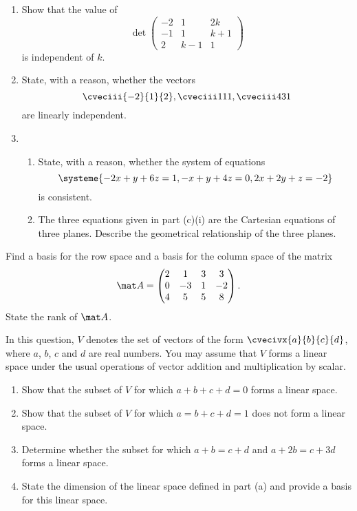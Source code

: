 \begin{problem}
    \begin{enumerate}
        \item Show that the value of \[\det \begin{pmatrix}
            -2 & 1 & 2k\\
            -1 & 1 & k+1\\
            2 & k-1 & 1
        \end{pmatrix}\] is independent of $k$.
        \item State, with a reason, whether the vectors \[\cveciii{-2}{1}{2}, \cveciii111, \cveciii431\] are linearly independent.
        \item \begin{enumerate}
            \item State, with a reason, whether the system of equations \[\systeme{-2x+y+6z=1,-x+y+4z=0,2x+2y+z=-2}\] is consistent.
            \item The three equations given in part (c)(i) are the Cartesian equations of three planes. Describe the geometrical relationship of the three planes.
        \end{enumerate}
    \end{enumerate}
\end{problem}

\begin{problem}
    Find a basis for the row space and a basis for the column space of the matrix \[\mat A = \begin{pmatrix}2 & 1 & 3 & 3 \\ 0 & -3 & 1 & -2 \\ 4 & 5 & 5 & 8\end{pmatrix}.\] State the rank of $\mat A$.
\end{problem}

\begin{problem}
    In this question, $V$ denotes the set of vectors of the form $\cvecivx{a}{b}{c}{d}$, where $a$, $b$, $c$ and $d$ are real numbers. You may assume that $V$ forms a linear space under the usual operations of vector addition and multiplication by scalar.

    \begin{enumerate}
        \item Show that the subset of $V$ for which $a + b + c + d = 0$ forms a linear space.
        \item Show that the subset of $V$ for which $a = b + c + d = 1$ does not form a linear space.
        \item Determine whether the subset for which $a + b = c + d$ and $a + 2b = c + 3d$ forms a linear space.
        \item State the dimension of the linear space defined in part (a) and provide a basis for this linear space.
    \end{enumerate}
\end{problem}

